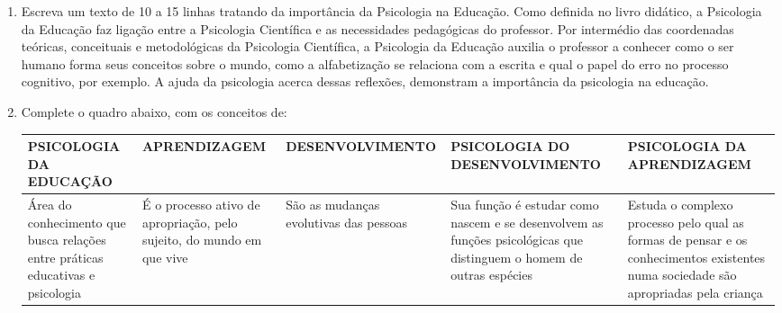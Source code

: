 \documentclass[a4paper, 12pt]{article}
\begin{document}
\begin{enumerate}
  
\item Escreva um texto de 10 a 15 linhas tratando da importância da Psicologia na Educação. \newline \newline
  Como definida no livro didático, a Psicologia da Educação faz ligação entre a Psicologia Científica e as necessidades pedagógicas do professor. Por intermédio das coordenadas teóricas, conceituais e metodológicas da Psicologia Científica, a Psicologia da Educação auxilia o professor a conhecer como o ser humano forma seus conceitos sobre o mundo, como a alfabetização se relaciona com a escrita e qual o papel do erro no processo cognitivo, por exemplo. A ajuda da psicologia acerca dessas reflexões, demonstram a importância da psicologia na educação.
  
\item Complete o quadro abaixo, com os conceitos de: \newline \newline
  \centering
  \begin{tabular}{| m{3cm} | m{4cm} | m{4cm} | m{3cm} | m{3cm} |}
      \hline
    PSICOLOGIA DA EDUCAÇÃO & APRENDIZAGEM & DESENVOLVIMENTO & PSICOLOGIA DO DESENVOLVIMENTO & PSICOLOGIA DA APRENDIZAGEM \\ \hline
    Área do conhecimento que busca relações entre práticas educativas e psicologia & É o processo ativo de apropriação, pelo sujeito, do mundo em que vive & São as mudanças evolutivas das pessoas & Sua função é estudar como nascem e se desenvolvem as funções psicológicas que distinguem o homem de outras espécies & Estuda o complexo processo pelo qual as formas de pensar e os conhecimentos existentes numa sociedade são apropriadas pela criança \\ \hline
  \end{tabular} \newline

 \end{enumerate}
\end{document}
